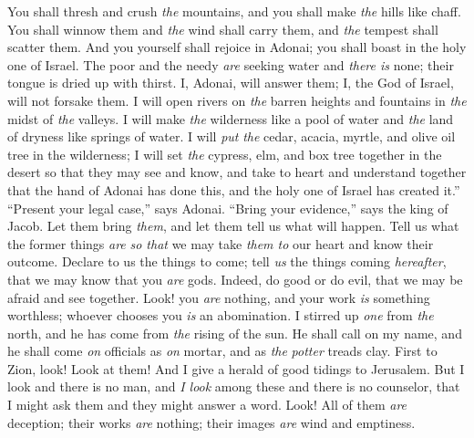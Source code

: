 \begin{biblechapter}
You shall thresh and crush \textit{the} mountains, 
and you shall make \textit{the} hills like chaff.
\verse You shall winnow them and \textit{the} wind shall carry them, 
and \textit{the} tempest shall scatter them. 
And you yourself shall rejoice in Adonai; 
you shall boast in the holy one of Israel.
\verse The poor and the needy \textit{are} seeking water and \textit{there is} none; 
their tongue is dried up with thirst. 
I, Adonai, will answer them; 
I, the God of Israel, will not forsake them.
\verse I will open rivers on \textit{the} barren heights 
and fountains in \textit{the} midst of \textit{the} valleys. 
I will make \textit{the} wilderness like a pool of water 
and \textit{the} land of dryness like springs of water.
\verse I will \textit{put} \textit{the} cedar, acacia, myrtle, and olive oil tree in the wilderness; 
I will set \textit{the} cypress, elm, and box tree together in the desert
\verse so that they may see and know, 
and take to heart and understand together 
that the hand of Adonai has done this, 
and the holy one of Israel has created it.”
\verse “Present your legal case,” says Adonai. 
“Bring your evidence,” says the king of Jacob.
\verse Let them bring \textit{them}, 
and let them tell us what will happen. 
Tell us what the former things \textit{are} 
\textit{so that} we may take \textit{them to} our heart 
and know their outcome. 
Declare to us the things to come;
\verse tell \textit{us} the things coming \textit{hereafter}, 
that we may know that you \textit{are} gods. 
Indeed, do good or do evil, 
that we may be afraid and see together.
\verse Look! you \textit{are} nothing, 
and your work \textit{is} something worthless; 
whoever chooses you \textit{is} an abomination.
\verse I stirred up \textit{one} from \textit{the} north, 
and he has come from \textit{the} rising of the sun. He shall call on my name,
\verse and he shall come \textit{on} officials as \textit{on} mortar, 
and as \textit{the} \textit{potter} treads clay.
\verse First to Zion, look! Look at them! And I give a herald of good tidings to Jerusalem.
\verse But I look and there is no man, 
and \textit{I look} among these and there is no counselor, 
that I might ask them and they might answer a word.
\verse Look! All of them \textit{are} deception; 
their works \textit{are} nothing; 
their images \textit{are} wind and emptiness.
\end{biblechapter}

